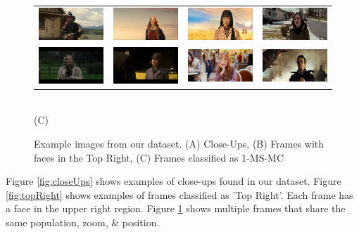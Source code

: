 \begin{figure}
\begin{center}
\begin{tabular}{cccc}
\includegraphics[width=0.15\linewidth]
  {fig/clust/09.jpg} 
& \includegraphics[width=0.15\linewidth]
  {fig/clust/10.jpg}  
& \includegraphics[width=0.15\linewidth]
  {fig/clust/11.jpg}   
& \includegraphics[width=0.15\linewidth]
  {fig/clust/12.jpg}
\\
\includegraphics[width=0.15\linewidth]
  {fig/clust/03.jpg} 
& \includegraphics[width=0.15\linewidth]
  {fig/clust/04.jpg}  
& \includegraphics[width=0.15\linewidth]
  {fig/clust/15.jpg}   
& \includegraphics[width=0.15\linewidth]
  {fig/clust/16.jpg}
\\
\end{tabular}
\\
\large{(C)}
\\
\end{center}
   \caption{Example images from our dataset. (A) Close-Ups, (B) Frames with faces in the Top Right, (C) Frames classified as 1-MS-MC}
\label{fig:closeUps}
\label{fig:topRight}
\label{fig:cluster}
\end{figure}

Figure \ref{fig:closeUps} shows examples of close-ups found in our dataset.
Figure \ref{fig:topRight} shows examples of frames classified as 'Top Right'. Each frame has a face in the upper right region.
Figure \ref{fig:cluster} shows multiple frames that share the same population, zoom, \& position.

